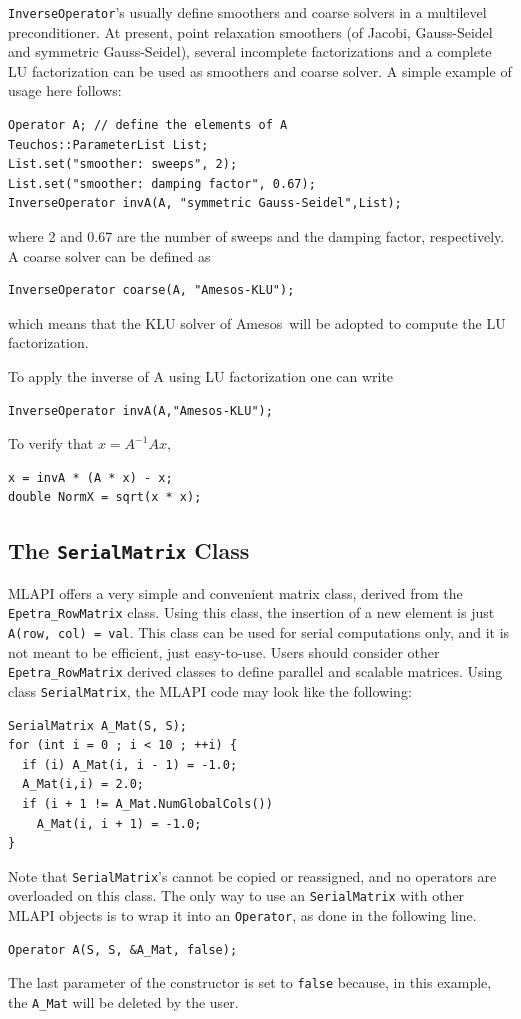 \documentclass{article}[11pt]
\newcommand{\amesos}  {{\sc Amesos}}
\newcommand{\MLAPI}  {{\sc MLAPI }}
\begin{document}
{\tt InverseOperator}'s usually define smoothers and coarse solvers in a
multilevel preconditioner. At present, point relaxation smoothers (of Jacobi,
Gauss-Seidel and symmetric Gauss-Seidel), several incomplete factorizations
and a complete LU factorization can be used as smoothers and coarse solver. A
simple example of usage here follows:
\begin{verbatim}
Operator A; // define the elements of A
Teuchos::ParameterList List;
List.set("smoother: sweeps", 2); 
List.set("smoother: damping factor", 0.67);
InverseOperator invA(A, "symmetric Gauss-Seidel",List);
\end{verbatim}
where 2 and 0.67 are the number of sweeps and the damping factor,
  respectively. A coarse solver can be defined as
\begin{verbatim}
InverseOperator coarse(A, "Amesos-KLU");
\end{verbatim}
which means that the KLU solver of \amesos\ will be adopted to compute the LU
factorization.

To apply the inverse of A using LU factorization one can write
\begin{verbatim}
InverseOperator invA(A,"Amesos-KLU");
\end{verbatim}
To verify that $x = A^{-1} A x$,
\begin{verbatim}
x = invA * (A * x) - x;
double NormX = sqrt(x * x);
\end{verbatim}

\subsection{The {\tt SerialMatrix} Class}
\label{sec:serialmatrix}

\MLAPI offers a very simple and convenient matrix class, derived from
 the \verb!Epetra_RowMatrix! class.
 Using this class, the insertion of a new
 element is just \verb!A(row, col) = val!. This class
can be used for serial computations only, and it is not meant to be efficient,
just easy-to-use. Users should consider
other \verb!Epetra_RowMatrix! derived classes
to define parallel and scalable matrices. Using class {\tt SerialMatrix}, the \MLAPI
code may look like the following:
\begin{verbatim}
SerialMatrix A_Mat(S, S);
for (int i = 0 ; i < 10 ; ++i) {
  if (i) A_Mat(i, i - 1) = -1.0;
  A_Mat(i,i) = 2.0;
  if (i + 1 != A_Mat.NumGlobalCols())
    A_Mat(i, i + 1) = -1.0;
}
\end{verbatim}
Note that {\tt SerialMatrix}'s cannot be copied or reassigned, and no
operators are overloaded on this class. The only way to use an
{\tt SerialMatrix} with other \MLAPI objects is to wrap it into an
{\tt Operator}, as done in the following line.
\begin{verbatim}
Operator A(S, S, &A_Mat, false);
\end{verbatim}
The last parameter of the constructor is set to {\tt false} because, in
this example, the
\verb!A_Mat! will be deleted by the user.
\end{document}
